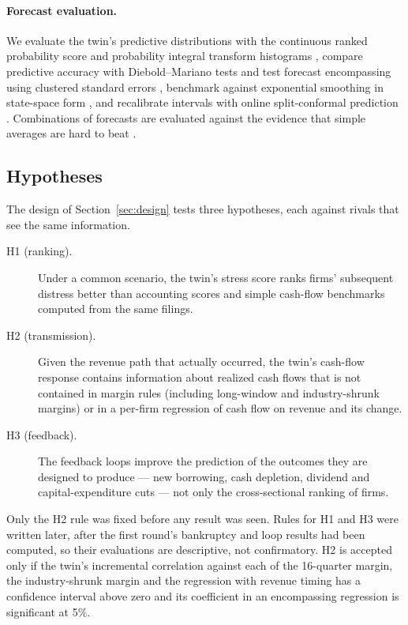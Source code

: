 \paragraph{Forecast evaluation.} We evaluate the twin's predictive distributions with the continuous ranked probability score and probability integral transform histograms \citep{gneiting2007,gneiting2007b}, compare predictive accuracy with Diebold--Mariano tests \citep{diebold1995} and test forecast encompassing \citep{harvey1998,clark2001,giacomini2006} using clustered standard errors \citep{petersen2009,cameron2008}, benchmark against exponential smoothing in state-space form \citep{hyndman2008}, and recalibrate intervals with online split-conformal prediction \citep{vovk2005,gibbs2021}. Combinations of forecasts are evaluated against the evidence that simple averages are hard to beat \citep{bates1969,clemen1989,timmermann2006,claeskens2016}.


\subsection{Hypotheses}
The design of Section~\ref{sec:design} tests three hypotheses, each against rivals that see the same information.

\begin{description}
\item[H1 (ranking).] Under a common scenario, the twin's stress score ranks firms' subsequent distress better than accounting scores and simple cash-flow benchmarks computed from the same filings.
\item[H2 (transmission).] Given the revenue path that actually occurred, the twin's cash-flow response contains information about realized cash flows that is not contained in margin rules (including long-window and industry-shrunk margins) or in a per-firm regression of cash flow on revenue and its change.
\item[H3 (feedback).] The feedback loops improve the prediction of the outcomes they are designed to produce --- new borrowing, cash depletion, dividend and capital-expenditure cuts --- not only the cross-sectional ranking of firms.
\end{description}

\noindent Only the H2 rule was fixed before any result was seen. Rules for H1 and H3 were written later, after the first round's bankruptcy and loop results had been computed, so their evaluations are descriptive, not confirmatory. H2 is accepted only if the twin's incremental correlation against each of the 16-quarter margin, the industry-shrunk margin and the regression with revenue timing has a confidence interval above zero and its coefficient in an encompassing regression \citep{chong1986,fair1990} is significant at 5\%.
